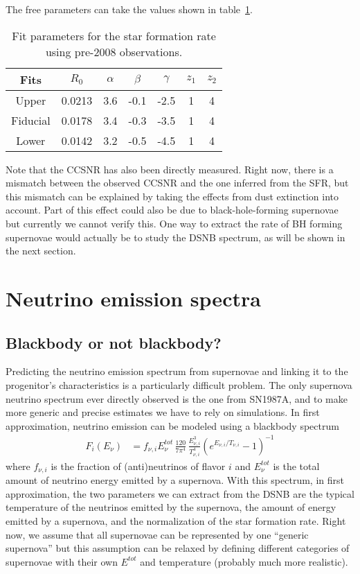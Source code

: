 \documentclass[12pt]{article}
\begin{document}
The free parameters can take the values shown in table~\ref{tab:csfrpar}.
\begin{table}[h]
    \centering
    \begin{tabular}{ccccccc}
        \toprule
        Fits & $R_0$ & $\alpha$ & $\beta$ & $\gamma$ & $z_1$ & $z_2$\\
        \midrule
        Upper & 0.0213 & 3.6 & -0.1 & -2.5 & 1 & 4\\
        Fiducial & 0.0178 & 3.4 & -0.3 & -3.5 & 1 & 4\\
        Lower & 0.0142 & 3.2 & -0.5 & -4.5 & 1 & 4\\
        \bottomrule
    \end{tabular}
    \label{tab:csfrpar}
    \caption{Fit parameters for the star formation rate using pre-2008 observations.}
\end{table}
Note that the CCSNR has also been directly measured. Right now, there is a mismatch between the observed CCSNR and the one inferred from the SFR, but this mismatch can be explained by taking the effects from dust extinction into account. Part of this effect could also be due to black-hole-forming supernovae but currently we cannot verify this. One way to extract the rate of BH forming supernovae would actually be to study the DSNB spectrum, as will be shown in the next section.
\section{Neutrino emission spectra}
\label{sec:emission}
\subsection{Blackbody or not blackbody?}
Predicting the neutrino emission spectrum from supernovae and linking it to the progenitor's characteristics is a particularly difficult problem. The only supernova neutrino spectrum ever directly observed is the one from SN1987A, and to make more generic and precise estimates we have to rely on simulations. In first approximation, neutrino emission can be modeled using a blackbody spectrum~\cite{Horiuchi:2008jz}
\begin{align}
    F_i(E_\nu) &= f_{\nu, i}E_\nu^{tot}\,\frac{120}{7\pi^4}\,\frac{E_{\nu,i}^3}{T_{\nu,i}^4}\left(e^{E_{\nu, i}/T_{\nu, i}} - 1\right)^{-1}
    \label{eq:blackbody}
\end{align}
where $f_{\nu,i}$ is the fraction of (anti)neutrinos of flavor $i$ and $E_\nu^{tot}$ is the total amount of neutrino energy emitted by a supernova. With this spectrum, in first approximation, the two parameters we can extract from the DSNB are the typical temperature of the neutrinos emitted by the supernova, the amount of energy emitted by a supernova, and the normalization of the star formation rate. Right now, we assume that all supernovae can be represented by one ``generic supernova'' but this assumption can be relaxed by defining different categories of supernovae with their own $E^{tot}$ and temperature (probably much more realistic).
\end{document}
